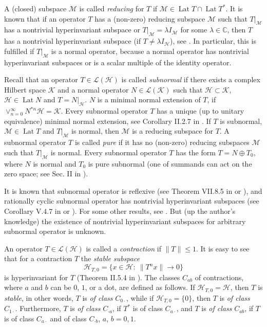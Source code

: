 \documentclass[a4paper,oneside,11pt]{amsart}
\numberwithin{equation}{section}
\theoremstyle{plain}
\theoremstyle{definition}
\begin{document}
A (closed) subspace $\mathcal M$ is called \emph{reducing} for $T$ if 
 $\mathcal M\in\operatorname{Lat}T\cap\operatorname{Lat}T^*$. 
It is known 
 that if an operator $T$ has a (non-zero) reducing subspace  $\mathcal M$ such that 
 $T|_{\mathcal M}$ has a nontrivial hyperinvariant subspace or $T|_{\mathcal M}=\lambda I_{\mathcal M}$ for some 
$\lambda\in \mathbb C$, then $T$ has  a nontrivial hyperinvariant subspace (if $T\neq\lambda I_{\mathcal H}$), see \cite{douglaspearcy}. 
 In particular, this is fulfilled if 
  $T|_{\mathcal M}$ is a normal operator,  because a normal operator has nontrivial hyperinvariant subspaces 
or is a scalar multiple of the identity operator.  


Recall that an operator $T\in\mathcal L(\mathcal H)$ is called \emph{subnormal}
 if there exists a complex Hilbert space $\mathcal K$ and a normal operator $N\in\mathcal L(\mathcal K)$ 
 such that $\mathcal H\subset\mathcal K$, $\mathcal H\in\operatorname{Lat}N$ and $T=N|_{\mathcal H}$.
$N$ is a minimal normal extension of $T$, if $\vee_{n=0}^\infty N^{*n}\mathcal H=\mathcal K$. 
 Every subnormal
operator $T$ has  a unique (up to unitary equivalence) minimal normal
extension, see Corollary II.2.7 in \cite{conwaysubnormal}.  
If $T$ is subnormal,  $\mathcal M\in\operatorname{Lat}T$ and $T|_{\mathcal M}$ is normal, then $\mathcal M$ is a reducing subspace
for $T$. A subnormal operator $T$ is called \emph{pure}
 if it has no (non-zero) reducing subspaces $\mathcal M$ such that $T|_{\mathcal M}$ is normal. 
Every subnormal operator $T$ has the form $T=N\oplus T_0$, where $N$ is normal and $T_0$ is  pure subnormal 
(one of summands can act on the zero space; see Sec. II in  \cite{conwaysubnormal}).   


It is known that subnormal operator is reflexive (see Theorem VII.8.5 in \cite{conwaysubnormal} or \cite{olinthomson}), 
 and rationally cyclic subnormal operator  has nontrivial hyperinvariant subspaces
(see Corollary V.4.7 in \cite{conwaysubnormal} or \cite{thomson}). For some other results, see \cite{foiasjungkopearcy}. 
But (up the author's knowledge) 
the existence of nontrivial hyperinvariant subspaces for arbitrary subnormal operator is unknown.


An operator $T\in\mathcal L(\mathcal H)$  is called 
a  \emph{contraction} if $\|T\|\leq 1$.  It is easy to see that for a contraction $T$ the \emph{stable subspace}  
\begin{equation}\label{hhtt0}\mathcal H_{T,0}=\{x\in\mathcal H :\ \|T^nx\|\to 0\}
\end{equation}
 is hyperinvariant for $T$ (Theorem II.5.4 in \cite{sznfbk}). 
The classes $C_{ab}$ of contractions, where 
 $a$ and $b$ can be $0$, $1$, or a dot,  
are defined as follows. If $\mathcal H_{T,0}=\mathcal H$, then  $T$ is \emph{stable}, in other words, $T$ is  \emph{of class} $C_{0\cdot}$, while if  $\mathcal H_{T,0}=\{0\}$, then $T$ is 
 \emph{of class} $C_{1\cdot}$. Furthermore,  $T$  is \emph{of class} $C_{\cdot a}$, if $T^*$ is of class  $C_{a\cdot}$,  
 and $T$ is  \emph{of class} $C_{ab}$, if $T$ is of class $C_{a\cdot}$ and of class $C_{\cdot b}$, $a$, $b=0,1$. 
\end{document}
